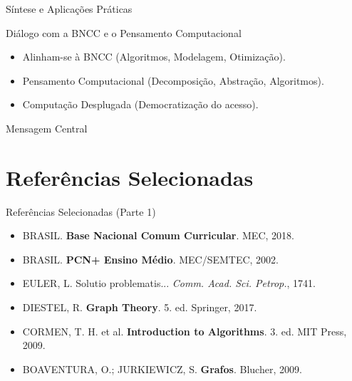 \documentclass[10pt]{beamer}
\begin{document}
\begin{frame}{S\'{i}ntese e Aplica\c{c}\~{o}es Pr\'{a}ticas}
\transdissolve
\begin{block}{Di\'{a}logo com a BNCC e o Pensamento Computacional}
\footnotesize
\begin{itemize}
    \setlength{\itemsep}{0pt}
    \item<2-> Alinham-se \`{a} BNCC (Algoritmos, Modelagem, Otimiza\c{c}\~{a}o).
    \item<3-> Pensamento Computacional (Decomposi\c{c}\~{a}o, Abstra\c{c}\~{a}o, Algoritmos).
    \item<4-> Computa\c{c}\~{a}o Desplugada (Democratiza\c{c}\~{a}o do acesso).
\end{itemize}
\end{block}
\vspace{0.2cm}
\begin{block}{Mensagem Central}
\end{block}
\end{frame}

\section*{Referências Selecionadas}

\begin{frame}{Referências Selecionadas (Parte 1)}
\transdissolve 
\footnotesize
\begin{itemize}
    \setlength{\itemsep}{0.35cm}
    \item BRASIL. \textbf{Base Nacional Comum Curricular}. MEC, 2018.
    \item BRASIL. \textbf{PCN+ Ensino Médio}. MEC/SEMTEC, 2002.
    \item EULER, L. Solutio problematis... \textit{Comm. Acad. Sci. Petrop.}, 1741.
    \item DIESTEL, R. \textbf{Graph Theory}. 5. ed. Springer, 2017.
    \item CORMEN, T. H. et al. \textbf{Introduction to Algorithms}. 3. ed. MIT Press, 2009.
    \item BOAVENTURA, O.; JURKIEWICZ, S. \textbf{Grafos}. Blucher, 2009.
\end{itemize}
\end{frame}
\end{document}
